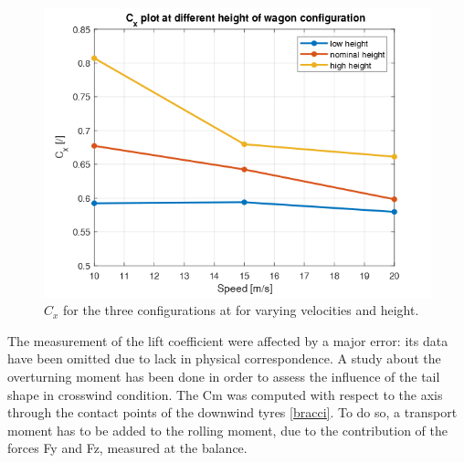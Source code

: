 \documentclass{elbioimp2}
\begin{document}
    \begin{figure}[htp]
      \centering
      \includegraphics[width=1\columnwidth]{cxwagon.png}
      \caption{$C_x$ for the three configurations at for varying velocities and height.\label{}}
    \end{figure}
    
 The measurement of the lift coefficient were affected by a major error: its data have been omitted due to lack in physical correspondence.
A study about the overturning moment has been done in order to assess the influence of the tail shape in crosswind condition. The Cm was computed with respect to the axis through the contact points of the downwind tyres \ref{bracci}. To do so, a transport moment has to be added to the rolling moment, due to the contribution of the forces Fy and Fz, measured at the balance.
\end{document}
